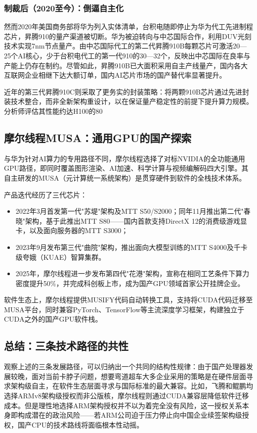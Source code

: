 \documentclass[a4paper]{article}
\begin{document}
\subsubsection{制裁后（2020至今）：倒逼自主化}
然而2020年美国商务部将华为列入实体清单，台积电随即停止为华为代工先进制程芯片，昇腾910的量产渠道被切断。华为被迫转向与中芯国际合作，利用DUV光刻技术实现7nm节点量产。由中芯国际代工的第二代昇腾910B每颗芯片可激活20—25个AI核心，少于台积电代工的第一代910的30—32个，反映出中芯国际在良率与产能上仍存在制约。尽管如此，昇腾910B已大面积采用自主产线量产，国内各大互联网企业相继下达大额订单，国内AI芯片市场的国产替代率显著提升。

近年的第三代昇腾910C则采取了更务实的封装策略：将两颗910B芯片通过先进封装技术整合，而非全新架构重设计，以在保证量产稳定性的前提下提升算力规模。分析师评估其性能约达H100的80%

\subsection{摩尔线程MUSA：通用GPU的国产探索}
与华为针对AI算力的专用路径不同，摩尔线程选择了对标NVIDIA的全功能通用GPU路径，即同时覆盖图形渲染、AI加速、科学计算与视频编解码四大引擎。其自主研发的MUSA（元计算统一系统架构）是贯穿硬件到软件的全栈技术体系。

产品迭代经历了三代芯片：
\begin{itemize}
  \item 2022年3月首发第一代"苏堤"架构及MTT S50/S2000；同年11月推出第二代"春晓"架构，基于此推出MTT S80——国内首款支持DirectX 12的消费级游戏显卡，以及面向服务器的MTT S3000；
  \item 2023年9月发布第三代"曲院"架构，推出面向大模型训练的MTT S4000及千卡级夸娥（KUAE）智算集群。
  \item 2025年，摩尔线程进一步发布第四代"花港"架构，宣称在相同工艺条件下算力密度提升50\%，并完成科创板上市，成为国产GPU领域首家公开挂牌企业。
\end{itemize}

软件生态上，摩尔线程提供MUSIFY代码自动转换工具，支持将CUDA代码迁移至MUSA平台，同时兼容PyTorch、TensorFlow等主流深度学习框架，构建独立于CUDA之外的国产GPU软件栈。

\subsection{总结：三条技术路径的共性}
观察上述的三条发展路径，可以归纳出一个共同的结构性规律：由于国产处理器发展较晚，面对当前卡脖子问题，想要弯道超车大多企业采用的策略是在硬件层面寻求架构级自主，在软件生态层面寻求与国际标准的最大兼容。比如，飞腾和鲲鹏均选择ARMv8架构级授权而非公版核，摩尔线程则通过CUDA兼容层降低软件迁移成本。但是理性地选择ARM架构授权并不以为着完全没有风险，这一授权关系本身即构成潜在的政治风险——若ARM公司迫于压力停止向中国企业续签架构级授权，国产CPU的技术路线将面临根本性动摇。
\end{document}
